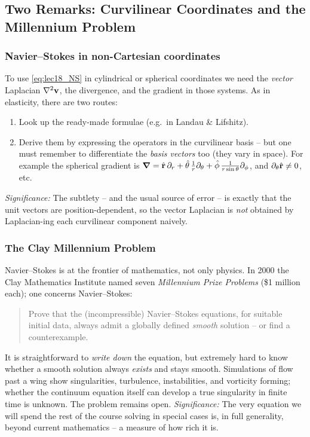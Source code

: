 \documentclass[../main.tex]{subfiles}
\begin{document}
\subsection{Two Remarks: Curvilinear Coordinates and the Millennium Problem}\label{sec:lec18:remarks}

\subsubsection*{Navier--Stokes in non-Cartesian coordinates}
To use \eqref{eq:lec18_NS} in cylindrical or spherical coordinates we need the \emph{vector} Laplacian $\nabla^2\mathbf{v}$, the divergence, and the gradient in those systems. As in elasticity, there are two routes:
\begin{enumerate}
  \item Look up the ready-made formulae (e.g.\ in Landau \& Lifshitz).
  \item Derive them by expressing the operators in the curvilinear basis -- but one must remember to differentiate the \emph{basis vectors} too (they vary in space). For example the spherical gradient is $\grad=\hat{\mathbf{r}}\,\partial_r+\hat{\mathbf{\theta}}\,\tfrac{1}{r}\partial_\theta+\hat{\mathbf{\phi}}\,\tfrac{1}{r\sin\theta}\partial_\phi$, and $\partial_\theta\hat{\mathbf{r}}\ne 0$, etc.
\end{enumerate}
\textit{Significance:} The subtlety -- and the usual source of error -- is exactly that the unit vectors are position-dependent, so the vector Laplacian is \emph{not} obtained by Laplacian-ing each curvilinear component naively.

\subsubsection*{The Clay Millennium Problem}
Navier--Stokes is at the frontier of mathematics, not only physics. In 2000 the Clay Mathematics Institute named seven \emph{Millennium Prize Problems} (\$1 million each); one concerns Navier--Stokes:
\begin{quote}
  Prove that the (incompressible) Navier--Stokes equations, for suitable initial data, always admit a globally defined \emph{smooth} solution -- or find a counterexample.
\end{quote}
It is straightforward to \emph{write down} the equation, but extremely hard to know whether a smooth solution always \emph{exists} and stays smooth. Simulations of flow past a wing show singularities, turbulence, instabilities, and vorticity forming; whether the continuum equation itself can develop a true singularity in finite time is unknown. The problem remains open.
\textit{Significance:} The very equation we will spend the rest of the course solving in special cases is, in full generality, beyond current mathematics -- a measure of how rich it is.
\end{document}
